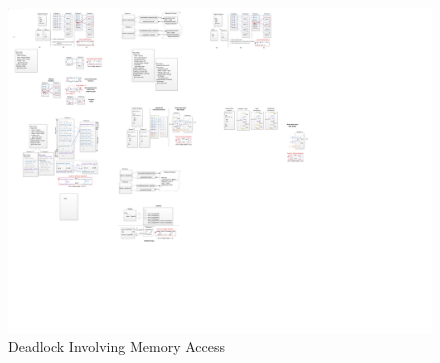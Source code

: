 \begin{figure}[htp]
\begin{center}
\includegraphics[width=0.9\linewidth]{chap4fig/outstandingSchedule.pdf}
\caption{Deadlock Involving Memory Access
\label{fig:ff}}
\end{center}
\end{figure}



